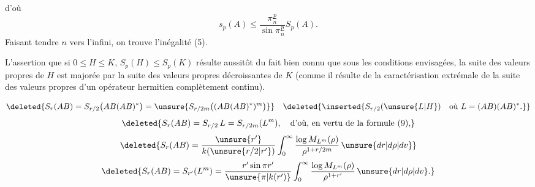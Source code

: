 d'où
\[
s_p(A)\leq\frac{\pi\frac{p}{n}}{\sin\pi\frac{p}{n}}S_p(A).
\]
Faisant tendre $n$ vers l'infini, on trouve l'inégalité (5).

L'assertion que si $0\leq H\leq K$,  
$S_p(H)\leq S_p(K)$ résulte aussitôt du fait
bien connu que sous les conditions envisagées,
la suite des valeurs propres  de $H$ est majorée
par la suite des valeurs propres décroissantes
de $K$  (comme il résulte de la caractérisation extrémale   de la suite des valeurs
propres d'un opérateur hermitien complètement continu).

\[
\deleted{S_r(AB)=S_{r/2}\bigl(AB(AB)^*\bigr)=
\unsure{S_{r/2m}\bigl((AB(AB)^*)^m\bigr)}}\quad
\deleted{\inserted{S_{r/2}(\unsure{L|H})\quad\text{où }L=(AB)(AB)^*.}}
\]
\[
\deleted{S_r(AB)=S_{r/2}\,L=S_{r/2m}(L^m),\quad\text{d'où, en vertu de la formule (9),}}
\]
\[
\deleted{S_r(AB)=\frac{\unsure{r'}}{k(\unsure{r/2|r'})}\int_0^\infty
\frac{\log M_{L^m}(\rho)}{\rho^{1+r/2m}}\,\unsure{dr|d\rho|dv}}
\]
\[
\deleted{S_r(AB)=S_{r'}(L^m)=\frac{r'\sin\pi r'}{\unsure{\pi|k(r')}}
\int_0^\infty\frac{\log M_{L^m}(\rho)}{\rho^{1+r'}}\,\unsure{dr|d\rho|dv}.}
\]
